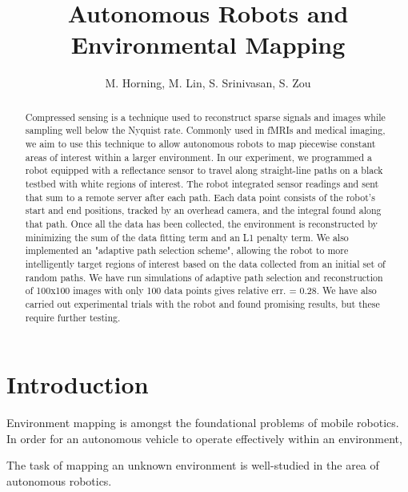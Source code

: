 \documentclass[english]{article}\usepackage[]{graphicx}\usepackage[]{color}
\begin{document}
\title{Autonomous Robots and Environmental Mapping}

\author{M. Horning, M. Lin, S. Srinivasan, S. Zou}

\maketitle

\begin{abstract}

Compressed sensing is a technique used to reconstruct sparse signals and images while sampling well below the Nyquist rate. Commonly used in fMRIs and medical imaging, we aim to use this technique to allow autonomous robots to map piecewise constant areas of interest within a larger environment. In our experiment, we programmed a robot equipped with a reflectance sensor to travel along straight-line paths on a black testbed with white regions of interest. The robot integrated sensor readings and sent that sum to a remote server after each path. Each data point consists of the robot's start and end positions, tracked by an overhead camera, and the integral found along that path. Once all the data has been collected, the environment is reconstructed by minimizing the sum of the data fitting term and an L1 penalty term. We also implemented an "adaptive path selection scheme", allowing the robot to more intelligently target regions of interest based on the data collected from an initial set of random paths. We have run simulations of adaptive path selection and reconstruction of 100x100 images with only 100 data points gives relative err. = 0.28. We have also carried out experimental trials with the robot and found promising results, but these require further testing.

\end{abstract}

\pagebreak
\tableofcontents
\pagebreak

\section{Introduction}

Environment mapping is amongst the foundational problems of mobile robotics. In order for an autonomous vehicle to operate effectively within an environment, 

The task of mapping an unknown environment is well-studied in the area of autonomous robotics. 
\end{document}
